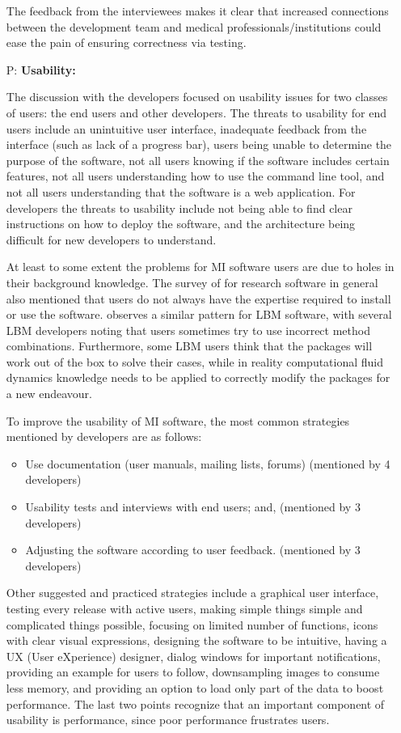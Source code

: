 \documentclass[final, 12pt, 3p, times]{elsarticle}
\newcounter{pnum} %
\begin{document}
\begin{enumerate}
The feedback from the interviewees makes it clear that increased connections
between the development team and medical professionals/institutions could ease
the pain of ensuring correctness via testing.

\item[P\refstepcounter{pnum}\thepnum \label{P_Usability}:]
\textbf{Usability:}  

The discussion with the developers focused on usability issues for two classes
of users: the end users and other developers.  The threats to usability for end
users include an unintuitive user interface, inadequate feedback from the
interface (such as lack of a progress bar), users being unable to determine the purpose of
the software, not all users knowing if the software includes certain features, not
all users understanding how to use the command line tool, and not all users
understanding that the software is a web application. For developers the threats to
usability include not being able to find clear instructions on how to deploy the
software, and the architecture being difficult for new developers to understand.

At least to some extent the problems for MI software users are due to holes in
their background knowledge.  The survey of \cite{WieseEtAl2019} for research
software in general also mentioned that users do not always have the expertise
required to install or use the software. \cite{SmithEtAl2024} observes a
similar pattern for LBM software, with several LBM developers noting that users
sometimes try to use incorrect method combinations. Furthermore, some LBM users
think that the packages will work out of the box to solve their cases, while in
reality computational fluid dynamics knowledge needs to be applied to correctly
modify the packages for a new endeavour.

To improve the usability of MI software, the most common strategies mentioned by
developers are as follows:

\begin{itemize}
    \item Use documentation (user manuals, mailing lists, forums) (mentioned by
    4 developers)
    \item Usability tests and interviews with end users; and, (mentioned by 3
    developers)
    \item Adjusting the software according to user feedback. (mentioned by 3
    developers)
\end{itemize}

Other suggested and practiced strategies include a graphical user interface,
testing every release with active users, making simple things simple and
complicated things possible, focusing on limited number of functions, icons with
clear visual expressions, designing the software to be intuitive, having a UX
(User eXperience) designer, dialog windows for important notifications,
providing an example for users to follow, downsampling images to consume less
memory, and providing an option to load only part of the data to boost
performance.  The last two points recognize that an important component of
usability is performance, since poor performance frustrates users.


\end{enumerate}
\end{document}

